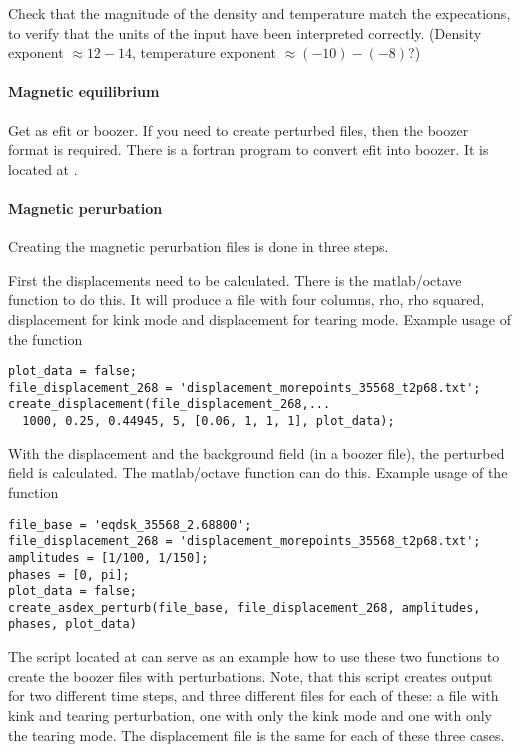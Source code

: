 Check that the magnitude of the density and temperature match the
expecations, to verify that the units of the input have been interpreted
correctly. (Density exponent $\approx 12-14$, temperature exponent $\approx (-10) - (-8)$?)

\paragraph{Magnetic equilibrium}
Get as efit or boozer. If you need to create perturbed files, then the
boozer format is required.
There is a fortran program to convert efit into boozer. It is located at
.

\paragraph{Magnetic perurbation}
Creating the magnetic perurbation files is done in three steps.

First the displacements need to be calculated. There is the
matlab/octave function  to do this. It
will produce a file with four columns, rho, rho squared, displacement
for kink mode and displacement for tearing mode. Example usage of the
function
\begin{verbatim}
plot_data = false;
file_displacement_268 = 'displacement_morepoints_35568_t2p68.txt';
create_displacement(file_displacement_268,...
  1000, 0.25, 0.44945, 5, [0.06, 1, 1, 1], plot_data);
\end{verbatim}
With the displacement and the background field (in a boozer file), the
perturbed field is calculated. The matlab/octave function
 can do this. Example usage of the
function
\begin{verbatim}
file_base = 'eqdsk_35568_2.68800';
file_displacement_268 = 'displacement_morepoints_35568_t2p68.txt';
amplitudes = [1/100, 1/150];
phases = [0, pi];
plot_data = false;
create_asdex_perturb(file_base, file_displacement_268, amplitudes, phases, plot_data)
\end{verbatim}

The script 
located at 
can serve as an example how to use these two functions to create the
boozer files with perturbations. Note, that this script creates output
for two different time steps, and three different files for each of
these: a file with kink and tearing perturbation, one with only the kink
mode and one with only the tearing mode. The displacement file is the
same for each of these three cases.

